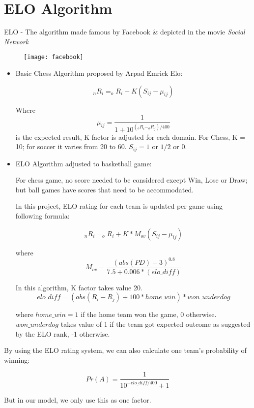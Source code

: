 \section{ELO Algorithm}


ELO - The algorithm made famous by Facebook \& depicted in the movie \textit{Social
Network}

\begin{figure}[h]
\centering
\texttt{[image: facebook]}
\end{figure}

\begin{itemize}
  \item Basic Chess Algorithm proposed by Arpad Emrick Elo:

\[ _{n}R_{i} = _{o}R_{i} + K(S_{ij} - \mu_{ij}) \]

Where 
\[ \mu_{ij} = \frac{1}{1+10^{(_{o}R_{i} - _{o}R_{j})/400}} \] is the expected
result, K factor is adjusted for each domain. For Chess, K = 10; for soccer it 
varies from 20 to 60. $S_{ij} = 1$ or $1/2$ or $0$.


  \item  ELO Algorithm adjusted to basketball game:


For chess game, no score needed to be considered except Win, Lose or Draw;
but ball games have scores that need to be accommodated.


In this project, ELO rating for each team is updated per game using following
formula:

\[ _{n}R_{i} = _{o}R_{i} + K*M_{ov}(S_{ij} - \mu_{ij}) \]


where 
\[ M_{ov} = \frac{(abs(PD) + 3)^{0.8}}{7.5 + 0.006*(elo\_diff)} \]


In this algorithm, K factor takes value 20. 
\[ elo\_diff = (abs(R_{i} - R_{j})+100*home\_win)*won\_underdog \]


where $home\_win = 1$ if the home team won the game, 0 otherwise. $won\_underdog$ 
takes value of 1 if the team got expected outcome as suggested by the ELO rank, -1 otherwise.

\end{itemize}

 
By using the ELO rating system, we can also calculate one team's probability
of winning:

\[ Pr(A) = \frac{1}{10 ^{-elo\_diff/400}+1} \]

But in our model, we only use this as one factor.


